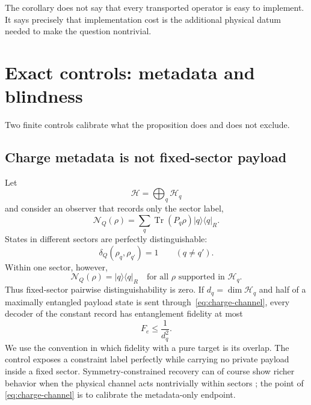 \documentclass[11pt]{article}
\newcommand{\cH}{\mathcal H}
\newcommand{\cN}{\mathcal N}
\newcommand{\Tr}{\operatorname{Tr}}
\begin{document}
The corollary does not say that every transported operator is easy to
implement.  It says precisely that implementation cost is the additional
physical datum needed to make the question nontrivial.

\section{Exact controls: metadata and blindness}
\label{sec:controls}

Two finite controls calibrate what the proposition does and does not exclude.

\subsection{Charge metadata is not fixed-sector payload}

Let
\begin{equation}
  \cH=\bigoplus_q\cH_q
  \label{eq:charge-decomp}
\end{equation}
and consider an observer that records only the sector label,
\begin{equation}
  \cN_Q(\rho)
  =\sum_q\Tr(P_q\rho)|q\rangle\langle q|_R.
  \label{eq:charge-channel}
\end{equation}
States in different sectors are perfectly distinguishable:
\begin{equation}
  \delta_Q(\rho_q,\rho_{q'})=1\qquad(q\neq q').
  \label{eq:header}
\end{equation}
Within one sector, however,
\begin{equation}
  \cN_Q(\rho)=|q\rangle\langle q|_R
  \quad\text{for all }\rho\text{ supported in }\cH_q.
  \label{eq:payloadblind}
\end{equation}
Thus fixed-sector pairwise distinguishability is zero.  If
$d_q=\dim\cH_q$ and half of a maximally entangled payload state is sent
through~\eqref{eq:charge-channel}, every decoder of the constant record has
entanglement fidelity at most
\begin{equation}
  F_e\leq \frac{1}{d_q^2}.
  \label{eq:Fe}
\end{equation}
We use the convention in which fidelity with a pure target is its overlap.
The control exposes a constraint label perfectly while carrying no private
payload inside a fixed sector.  Symmetry-constrained recovery can of course
show richer behavior when the physical channel acts nontrivially within
sectors \citep{NakataClouded}; the point of
\eqref{eq:charge-channel} is to calibrate the metadata-only endpoint.
\end{document}
